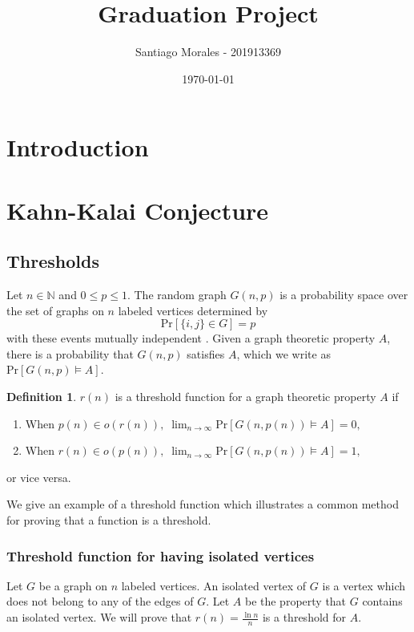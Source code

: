 \documentclass[12pt]{article}
\theoremstyle{definition}
\newtheorem{definition}{Definition}[section]
\theoremstyle{remark}
\def\N{\ensuremath{\mathbb{N}}}
\def\Pr{\ensuremath{\mbox{Pr}}}
\begin{document}
\title{Graduation Project}
\author{Santiago Morales - 201913369}
\date{\today}

\maketitle
\section{Introduction}

\section{Kahn-Kalai Conjecture}

\subsection{Thresholds}

Let $n \in \N$ and $0 \leq p \leq 1$. The random graph $G(n, p)$ is a probability space over the set of graphs on $n$ labeled vertices determined by
\[\Pr[\{i, j\} \in G] = p\] 
with these events mutually independent \cite{alon2016probabilistic}. Given a graph theoretic property $A$, there is a probability that $G(n, p)$ satisfies $A$, which we write as $\Pr[G(n, p) \vDash A]$. 

\begin{definition}
    $r(n)$ is a threshold function for a graph theoretic property $A$ if 
    \begin{enumerate}
        \item When \(p(n) \in o(r(n)), \; \lim_{n \to \infty} \Pr[G(n, p(n)) \vDash A] = 0,\)
        \item When \(r(n) \in o(p(n)), \;  \lim_{n \to \infty} \Pr[G(n, p(n)) \vDash A] = 1,\) 
    \end{enumerate}
    or vice versa. \cite{alon2016probabilistic}
\end{definition}

We give an example of a threshold function which illustrates a common method for proving that a function is a threshold. \par

\subsubsection{Threshold function for having isolated vertices}

Let $G$ be a graph on $n$ labeled vertices. An isolated vertex of $G$ is a vertex which does not belong to any of the edges of $G$. Let $A$ be the property that $G$ contains an isolated vertex. We will prove that $\displaystyle{r(n) = \frac{\ln n}{n}}$ is a threshold for $A$. \par
\end{document}
